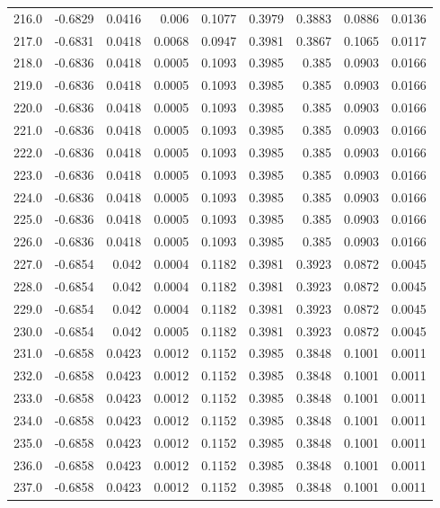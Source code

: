 \begin{longtable}{lrrrrrrrr}
216.0 & -0.6829 & 0.0416 & 0.006 & 0.1077 & 0.3979 & 0.3883 & 0.0886 & 0.0136 \\
217.0 & -0.6831 & 0.0418 & 0.0068 & 0.0947 & 0.3981 & 0.3867 & 0.1065 & 0.0117 \\
218.0 & -0.6836 & 0.0418 & 0.0005 & 0.1093 & 0.3985 & 0.385 & 0.0903 & 0.0166 \\
219.0 & -0.6836 & 0.0418 & 0.0005 & 0.1093 & 0.3985 & 0.385 & 0.0903 & 0.0166 \\
220.0 & -0.6836 & 0.0418 & 0.0005 & 0.1093 & 0.3985 & 0.385 & 0.0903 & 0.0166 \\
221.0 & -0.6836 & 0.0418 & 0.0005 & 0.1093 & 0.3985 & 0.385 & 0.0903 & 0.0166 \\
222.0 & -0.6836 & 0.0418 & 0.0005 & 0.1093 & 0.3985 & 0.385 & 0.0903 & 0.0166 \\
223.0 & -0.6836 & 0.0418 & 0.0005 & 0.1093 & 0.3985 & 0.385 & 0.0903 & 0.0166 \\
224.0 & -0.6836 & 0.0418 & 0.0005 & 0.1093 & 0.3985 & 0.385 & 0.0903 & 0.0166 \\
225.0 & -0.6836 & 0.0418 & 0.0005 & 0.1093 & 0.3985 & 0.385 & 0.0903 & 0.0166 \\
226.0 & -0.6836 & 0.0418 & 0.0005 & 0.1093 & 0.3985 & 0.385 & 0.0903 & 0.0166 \\
227.0 & -0.6854 & 0.042 & 0.0004 & 0.1182 & 0.3981 & 0.3923 & 0.0872 & 0.0045 \\
228.0 & -0.6854 & 0.042 & 0.0004 & 0.1182 & 0.3981 & 0.3923 & 0.0872 & 0.0045 \\
229.0 & -0.6854 & 0.042 & 0.0004 & 0.1182 & 0.3981 & 0.3923 & 0.0872 & 0.0045 \\
230.0 & -0.6854 & 0.042 & 0.0005 & 0.1182 & 0.3981 & 0.3923 & 0.0872 & 0.0045 \\
231.0 & -0.6858 & 0.0423 & 0.0012 & 0.1152 & 0.3985 & 0.3848 & 0.1001 & 0.0011 \\
232.0 & -0.6858 & 0.0423 & 0.0012 & 0.1152 & 0.3985 & 0.3848 & 0.1001 & 0.0011 \\
233.0 & -0.6858 & 0.0423 & 0.0012 & 0.1152 & 0.3985 & 0.3848 & 0.1001 & 0.0011 \\
234.0 & -0.6858 & 0.0423 & 0.0012 & 0.1152 & 0.3985 & 0.3848 & 0.1001 & 0.0011 \\
235.0 & -0.6858 & 0.0423 & 0.0012 & 0.1152 & 0.3985 & 0.3848 & 0.1001 & 0.0011 \\
236.0 & -0.6858 & 0.0423 & 0.0012 & 0.1152 & 0.3985 & 0.3848 & 0.1001 & 0.0011 \\
237.0 & -0.6858 & 0.0423 & 0.0012 & 0.1152 & 0.3985 & 0.3848 & 0.1001 & 0.0011 \\

\end{longtable}
